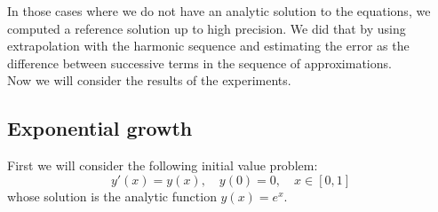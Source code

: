 In those cases where we do not have an analytic solution to the equations, we computed a reference solution up to high precision. We did that by using extrapolation with the harmonic sequence and estimating the error as the difference between successive terms in the sequence of approximations.\\

Now we will consider the results of the experiments.

\subsection{Exponential growth}
First we will consider the following initial value problem:
\begin{equation}\label{42}
y'(x) = y(x),\quad y(0) = 0, \quad x\in [0,1]
\end{equation}
whose solution is the analytic function \(y(x) = e^x\).

